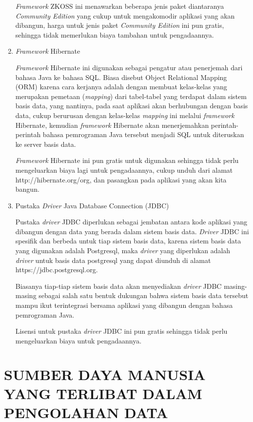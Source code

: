 \documentclass[pdftex,12pt, oneside]{article}
\begin{document}
\begin{enumerate}[1.]
\textit{Framework} ZKOSS ini menawarkan beberapa jenis paket diantaranya \textit{Community Edition} yang cukup untuk mengakomodir aplikasi yang akan dibangun, harga untuk jenis paket \textit{Community Edition} ini pun gratis, sehingga tidak memerlukan biaya tambahan untuk pengadaannya.
  
  \item \textit{Framework} Hibernate
  
\textit{Framework} Hibernate ini digunakan sebagai pengatur atau penerjemah dari bahasa Java ke bahasa SQL. Biasa disebut Object Relational Mapping (ORM) karena cara kerjanya adalah dengan membuat kelas-kelas yang merupakan pemetaan (\textit{mapping}) dari tabel-tabel yang terdapat dalam sistem basis data, yang nantinya, pada saat aplikasi akan berhubungan dengan basis data, cukup berurusan dengan kelas-kelas \textit{mapping} ini melalui \textit{framework} Hibernate, kemudian \textit{framework} Hibernate akan menerjemahkan perintah-perintah bahasa pemrograman Java tersebut menjadi SQL untuk diteruskan ke server basis data.

\textit{Framework} Hibernate ini pun gratis untuk digunakan sehingga tidak perlu mengeluarkan biaya lagi untuk pengadaannya, cukup unduh dari alamat http://hibernate.org/org, dan pasangkan pada aplikasi yang akan kita bangun.
  
  \item Pustaka \textit{Driver} Java Database Connection (JDBC)
  
Pustaka \textit{driver} JDBC diperlukan sebagai jembatan antara kode aplikasi yang dibangun dengan data yang berada dalam sistem basis data. \textit{Driver} JDBC ini spesifik dan berbeda untuk tiap sistem basis data, karena sistem basis data yang digunakan adalah Postgresql, maka \textit{driver} yang diperlukan adalah \textit{driver} untuk basis data postgresql yang dapat diunduh di alamat https://jdbc.postgresql.org.

Biasanya tiap-tiap sistem basis data akan menyediakan \textit{driver} JDBC masing-masing sebagai salah satu bentuk dukungan bahwa sistem basis data tersebut mampu ikut terintegrasi bersama aplikasi yang dibangun dengan bahasa pemrograman Java.

Lisensi untuk pustaka \textit{driver} JDBC ini pun gratis sehingga tidak perlu mengeluarkan biaya untuk pengadaannya.

\end{enumerate}

\section{SUMBER DAYA MANUSIA YANG TERLIBAT DALAM PENGOLAHAN DATA}
\end{document}

